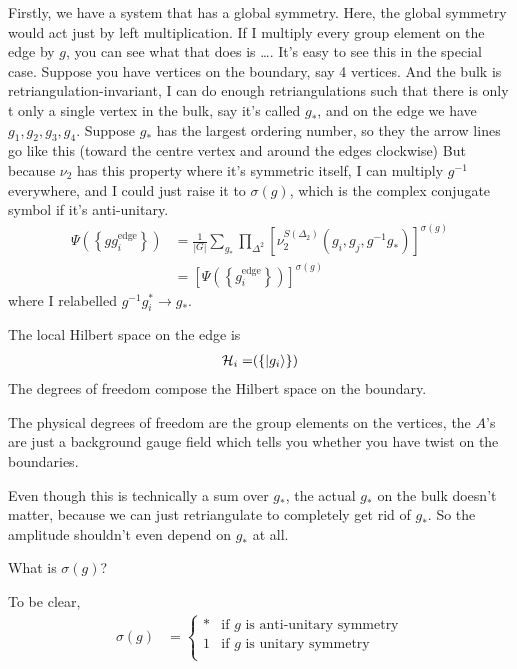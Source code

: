 Firstly,
we have a system that has a global symmetry.
Here,
the global symmetry would act just by left multiplication.
If I multiply every group element on the edge by $g$,
you can see what that does is \ldots.
It's easy to see this in the special case.
Suppose you have vertices on the boundary, say 4 vertices.
And the bulk is retriangulation-invariant,
I can do enough retriangulations such that there is only t only a single vertex
in the bulk, say it's called $g_*$,
and on the edge we have $g_1, g_2, g_3, g_4$.
Suppose $g_*$ has the largest ordering number,
so they the arrow lines go like this (toward the centre vertex and around the
edges clockwise)
But because $\nu_2$ has this property where it's symmetric itself,
I can multiply $g^{-1}$ everywhere,
and I could just raise it to $\sigma(g)$,
which is the complex conjugate symbol if it's anti-unitary.
\begin{align}
    \Psi\left( \left\{ g g_i^{\text{edge}} \right\} \right)
    &=
    \frac{1}{|G|}
    \sum_{g_*}
    \prod_{\Delta^2}
    \left[ \nu_2^{S\left( \Delta_2 \right)}
    \left( g_i, g_j, g^{-1} g_* \right)\right]^{\sigma(g)}\\
    &=
    \left[ \Psi\left( \left\{ g_i^{\textrm{edge}} \right\} \right)
    \right]^{\sigma(g)}
\end{align}
where I relabelled $g^{-1} g_i^* \to g_*$.

The local Hilbert space on the edge is
\begin{align}
    \mathcal{H}_i &=
    \span\left( \left\{ \ket{g_i} \right\} \right)
\end{align}
The degrees of freedom compose the Hilbert space on the boundary.

The physical degrees of freedom are the group elements on the vertices,
the $A$'s are just a background gauge field which tells you whether you have
twist on the boundaries.

Even though this is technically a sum over $g_*$,
the actual $g_*$ on the bulk doesn't matter,
because we can just retriangulate to completely get rid of $g_*$.
So the amplitude shouldn't even depend on $g_*$ at all.

\begin{question}
    What is $\sigma(g)$?
\end{question}
To be clear,
\begin{align}
    \sigma(g) &=
    \begin{cases}
        * & \text{if $g$ is anti-unitary symmetry}\\
        1 & \text{if $g$ is unitary symmetry}\\
    \end{cases}
\end{align}


